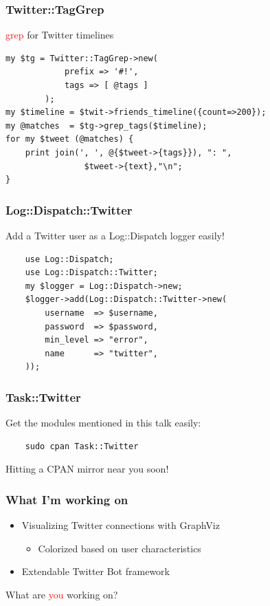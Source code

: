 \documentclass[12pt]{beamer}
\begin{document}
\begin{frame}[fragile]
    \frametitle{Twitter::TagGrep}
    \textcolor{red}{grep} for Twitter timelines
    \begin{verbatim}
my $tg = Twitter::TagGrep->new( 
            prefix => '#!',
            tags => [ @tags ] 
        );
my $timeline = $twit->friends_timeline({count=>200});
my @matches  = $tg->grep_tags($timeline);
for my $tweet (@matches) {
    print join(', ', @{$tweet->{tags}}), ": ",
                $tweet->{text},"\n";
}
    \end{verbatim}
\end{frame}


\begin{frame}[fragile]
    \frametitle{Log::Dispatch::Twitter}
    Add a Twitter user as a Log::Dispatch logger easily!
    \begin{verbatim}
    use Log::Dispatch;
    use Log::Dispatch::Twitter;
    my $logger = Log::Dispatch->new;
    $logger->add(Log::Dispatch::Twitter->new(
        username  => $username,
        password  => $password,
        min_level => "error",
        name      => "twitter",
    ));
    \end{verbatim}
\end{frame}

\begin{frame}[fragile]
    \frametitle{Task::Twitter}
Get the modules mentioned in this talk easily:
    \begin{verbatim}
    sudo cpan Task::Twitter
    \end{verbatim}
Hitting a CPAN mirror near you soon!
\end{frame}

\begin{frame}
    \frametitle{What I'm working on}
    \begin{itemize}
    \item Visualizing Twitter connections with GraphViz
        \begin{itemize}
        \item Colorized based on user characteristics
        \end{itemize}
    \item Extendable Twitter Bot framework
    \end{itemize}
    What are \textcolor{red}{you} working on?

\end{frame}
\end{document}
